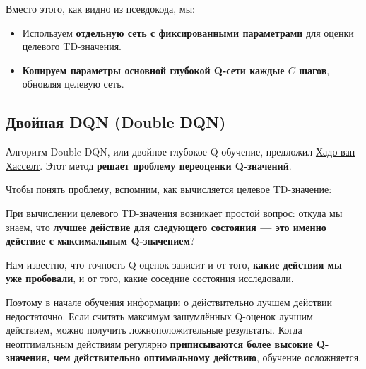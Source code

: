 \documentclass[11pt,a4paper]{article}
\begin{document}

Вместо этого, как видно из псевдокода, мы:

\begin{itemize}
\tightlist
\item
Используем \textbf{отдельную сеть с фиксированными параметрами} для оценки целевого TD-значения.
\item
\textbf{Копируем параметры основной глубокой Q-сети каждые \(C\) шагов}, обновляя целевую сеть.
\end{itemize}


\subsection{Двойная DQN (Double DQN)}\label{double-dqn}

Алгоритм Double DQN, или двойное глубокое Q-обучение, предложил \href{https://papers.nips.cc/paper/3964-double-q-learning}{Хадо ван Хасселт}. Этот метод \textbf{решает проблему переоценки Q-значений}.

Чтобы понять проблему, вспомним, как вычисляется целевое TD-значение:


При вычислении целевого TD-значения возникает простой вопрос: откуда мы знаем, что \textbf{лучшее действие для следующего состояния --- это именно действие с максимальным Q-значением}?

Нам известно, что точность Q-оценок зависит и от того, \textbf{какие действия мы уже пробовали}, и от того, какие соседние состояния исследовали.

Поэтому в начале обучения информации о действительно лучшем действии недостаточно. Если считать максимум зашумлённых Q-оценок лучшим действием, можно получить ложноположительные результаты. Когда неоптимальным действиям регулярно \textbf{приписываются более высокие Q-значения, чем действительно оптимальному действию}, обучение осложняется.
\end{document}
